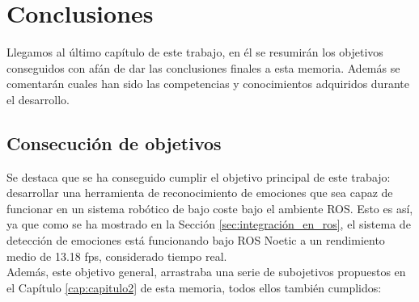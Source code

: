 \chapter{Conclusiones}
\label{cap:capitulo5}

Llegamos al último capítulo de este trabajo, en él se resumirán los objetivos conseguidos con afán de dar las conclusiones finales a esta memoria. Además se comentarán cuales han sido las competencias y conocimientos adquiridos durante el desarrollo.

\section{Consecución de objetivos}

Se destaca que se ha conseguido cumplir el objetivo principal de este trabajo: desarrollar una herramienta de reconocimiento de emociones que sea capaz de funcionar en un sistema robótico de bajo coste bajo el ambiente ROS. Esto es así, ya que como se ha mostrado en la Sección \ref{sec:integración_en_ros}, el sistema de detección de emociones está funcionando bajo ROS Noetic a un rendimiento medio de 13.18 fps, considerado tiempo real.\\

Además, este objetivo general, arrastraba una serie de subojetivos propuestos en el Capítulo \ref{cap:capitulo2} de esta memoria, todos ellos también cumplidos:

